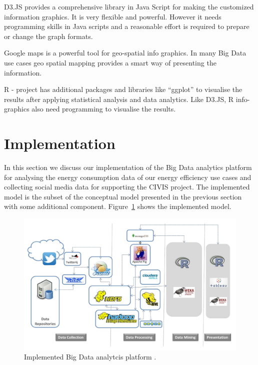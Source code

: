 D3.JS provides a comprehensive library in Java Script for making the customized information graphics. It is very flexible and powerful. However it needs programming skills in Java scripts and a reasonable effort is required to prepare or change the graph formats. 

Google maps is a powerful tool for geo-spatial info graphics. In many Big Data use cases geo spatial mapping provides a smart way of presenting the information.

R - project has additional packages and libraries like ``ggplot'' to visualise the results after applying statistical analysis and data analytics. Like D3.JS, R info-graphics also need programming to visualise the results.

\section{Implementation} \label{implemented} 
In this section we discuss our implementation of the Big Data analytics platform for analysing the energy consumption data of our energy efficiency use cases and collecting social media data for supporting the CIVIS project. The implemented model is the subset of the conceptual model presented in the previous section with some additional component. Figure~\ref{fig:iplatform} shows the implemented model.   
\begin{figure}[!ht]
    \begin{center}
      \includegraphics[width=\textwidth]{images/iplatform.pdf}
      \caption{Implemented Big Data analytcis platform .}
      \label{fig:iplatform}
    \end{center}
  \end{figure} 
